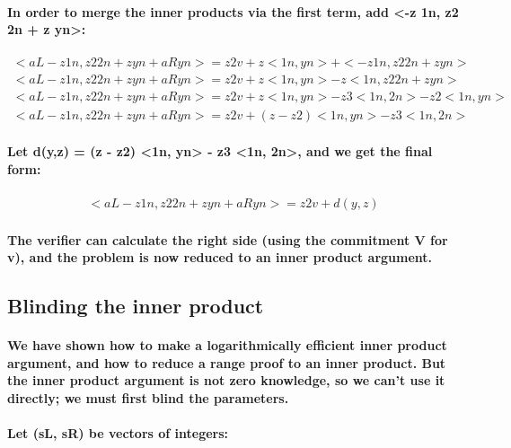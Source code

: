 \documentclass{article}
\begin{document}
\paragraph{In order to merge the inner products via the first term, add <-z 1n, z2 2n + z yn>:}

\begin{eqnarray}
  <aL - z 1n, z2 2n + z yn + aRyn> = z2 v + z <1n, yn> + <-z 1n, z2 2n + z yn>\\
  <aL - z 1n, z2 2n + z yn + aRyn> = z2 v + z <1n, yn> - z <1n, z2 2n + z yn>\\
  <aL - z 1n, z2 2n + z yn + aRyn> = z2 v + z <1n, yn> - z3 <1n, 2n> - z2 <1n, yn>\\
  <aL - z 1n, z2 2n + z yn + aRyn> = z2 v + (z - z2) <1n, yn> - z3 <1n, 2n>
\end{eqnarray}
  
\paragraph{Let d(y,z) = (z - z2) <1n, yn> - z3 <1n, 2n>, and we get the final form:}

\begin{eqnarray}
  <aL - z 1n, z2 2n + z yn + aRyn> = z2 v + d(y,z)
\end{eqnarray}

\paragraph{The verifier can calculate the right side (using the commitment V for v), and the problem is now reduced to an inner product argument.}


\subsection{Blinding the inner product}

\paragraph{We have shown how to make a logarithmically efficient inner product argument, and how to reduce a range proof to an inner product.  But the inner product argument is not zero knowledge, so we can’t use it directly; we must first blind the parameters.}

\paragraph{Let (sL, sR) be vectors of integers:}
\end{document}
